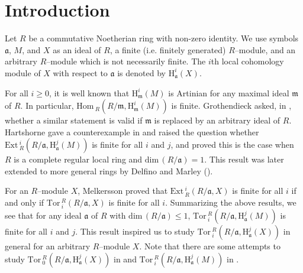 \documentclass[10pt]{amsart}
\newcommand{\Hom}{\mbox{Hom}\,}
\newcommand{\Ext}{\mbox{Ext}\,}
\newcommand{\Tor}{\mbox{Tor}\,}
\renewcommand{\dim}{\mbox{dim}\,}
\renewcommand{\H}{\mbox{H}}
\newcommand{\fa}{\mathfrak{a}}
\newcommand{\fm}{\mathfrak{m}}
\begin{document}
\maketitle



\section{Introduction}
Let $R$ be a commutative Noetherian ring with non-zero identity. We use symbols
$\fa$, $M$, and $X$ as an ideal of $R$, a finite (i.e. finitely generated)
$R$--module, and an arbitrary $R$--module which is not necessarily finite.
The $i$th local cohomology module of $X$ with respect to $\fa$ is denoted
by $\H_\fa^i(X)$.

For all $i\geq 0$, it is well known that $\H^i_\fm(M)$ is Artinian for any
maximal ideal $\fm$ of $R$. In particular, $\Hom_R(R/\fm, \H^i_\fm(M))$ is finite.
Grothendieck asked, in \cite {G}, whether a similar statement is valid if
$\fm$ is replaced by an arbitrary ideal of $R$. Hartshorne gave a counterexample
in \cite {Ha2} and raised the question whether $\Ext^{i}_{R}(R/\fa, \H^{j}_{\fa}(M))$
is finite for all $i$ and $j$, and proved this is the case when $R$ is a
complete regular local ring and $\dim(R/\fa)= 1$. This result was later extended to
more general rings by Delfino and Marley  (\cite [Theorem 1]{DM}).

For an $R$--module $X$, Melkersson \cite [Theorem 2.1]{Mel} proved that
$\Ext_R^i(R/\fa, X)$ is finite for all $i$ if and only if
$\Tor_i^R(R/\fa, X)$ is finite for all $i$. Summarizing the above results,
we see that for any ideal $\fa$ of $R$ with $\dim(R/\fa)\leq 1$,
$\Tor_i^R(R/\fa, \H_\fa^j(M))$ is finite for all $i$ and $j$.
This result inspired us to study $\Tor_i^R(R/\fa, \H_\fa^j(X))$ in general for an
arbitrary $R$--module $X$.
Note that there are some attempts to study $\Tor_0^R(R/\fa, \H_\fa^j(X))$ in \cite {AT} and
$\Tor_i^R(R/\fa, \H_\fa^j(M))$ in \cite {KH}.
\end{document}
